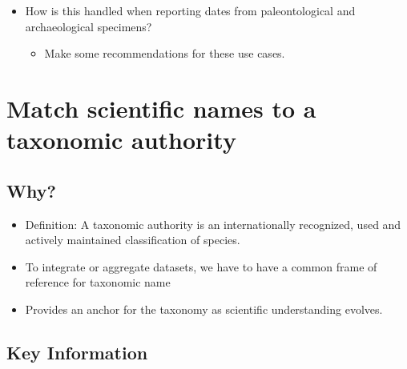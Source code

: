 \documentclass[
  oneside]{book}
\providecommand{\tightlist}{%
  \setlength{\itemsep}{0pt}\setlength{\parskip}{0pt}}
\begin{document}
\begin{itemize}
\tightlist
\item
  How is this handled when reporting dates from paleontological and archaeological specimens?

  \begin{itemize}
  \tightlist
  \item
    Make some recommendations for these use cases.
  \end{itemize}
\end{itemize}

\hypertarget{match-scientific-names-to-a-taxonomic-authority}{%
\section{Match scientific names to a taxonomic authority}\label{match-scientific-names-to-a-taxonomic-authority}}

\hypertarget{why-3}{%
\subsection{Why?}\label{why-3}}

\begin{itemize}
\tightlist
\item
  Definition: A taxonomic authority is an internationally recognized, used and actively maintained classification of species.
\item
  To integrate or aggregate datasets, we have to have a common frame of reference for taxonomic name
\item
  Provides an anchor for the taxonomy as scientific understanding evolves.
\end{itemize}

\hypertarget{key-information-3}{%
\subsection{Key Information}\label{key-information-3}}
\end{document}
